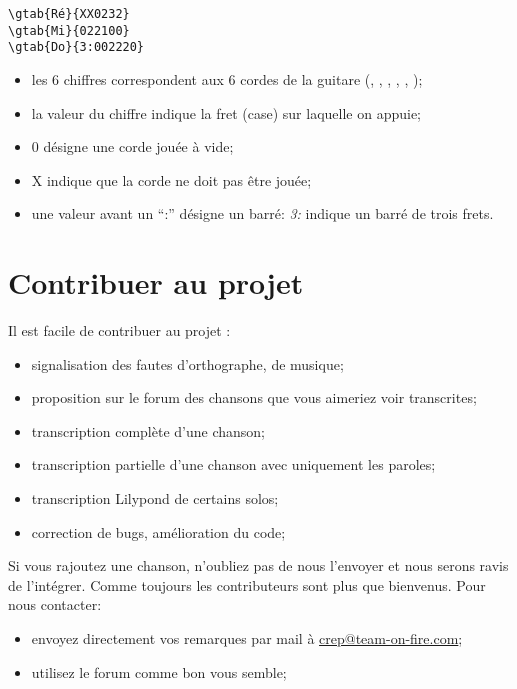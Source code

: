 \documentclass[versionenligne]{patacrep}
\begin{document}
\begin{verbatim}
\gtab{Ré}{XX0232}
\gtab{Mi}{022100}
\gtab{Do}{3:002220}
\end{verbatim}

\begin{itemize}
\item les 6 chiffres correspondent aux 6 cordes de la guitare
  (, , , ,
  , );
\item la valeur du chiffre indique la fret (case) sur laquelle on
  appuie;
\item 0 désigne une corde jouée à vide;
\item X indique que la corde ne doit pas être jouée;
\item une valeur avant un ``:'' désigne un barré: \emph{3:} indique un
  barré de trois frets.
\end{itemize}


\section{Contribuer au projet}

Il est facile de contribuer au projet :

\begin{itemize}
\item signalisation des fautes d'orthographe, de musique;
\item proposition sur le forum des chansons que vous aimeriez voir transcrites;
\item transcription complète d'une chanson;
\item transcription partielle d'une chanson avec uniquement les paroles;
\item transcription Lilypond de certains solos;
\item correction de bugs, amélioration du code;
\end{itemize}

Si vous rajoutez une chanson, n'oubliez pas de nous l'envoyer et nous
serons ravis de l'intégrer. Comme toujours les contributeurs sont plus
que bienvenus. Pour nous contacter:

\begin{itemize}
\item envoyez directement vos remarques par mail à
  \url{crep@team-on-fire.com};
\item utilisez le forum comme bon vous semble;
\end{itemize}
\end{document}
